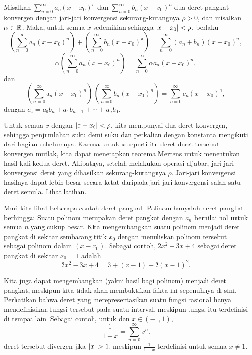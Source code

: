 \begin{prop}
Misalkan $\sum_{n=0}^\infty a_n {(x-x_0)}^n$ dan
$\sum_{n=0}^\infty b_n {(x-x_0)}^n$ dua deret pangkat konvergen
dengan jari-jari konvergensi sekurang-kurangnya $\rho > 0$, dan misalkan $\alpha \in {\mathbb{R}}$.  Maka,
untuk semua $x$ sedemikian sehingga $\lvert {x-x_0} \rvert < \rho$, berlaku
\begin{equation*}
\left(\sum_{n=0}^\infty a_n {(x-x_0)}^n\right)
+
\left(\sum_{n=0}^\infty b_n {(x-x_0)}^n\right)
=
\sum_{n=0}^\infty (a_n+b_n) {(x-x_0)}^n ,
\end{equation*}
\begin{equation*}
\alpha
\left(\sum_{n=0}^\infty a_n {(x-x_0)}^n\right)
=
\sum_{n=0}^\infty \alpha a_n {(x-x_0)}^n ,
\end{equation*}
dan
\begin{equation*}
\left(\sum_{n=0}^\infty a_n {(x-x_0)}^n\right)
\,
\left(\sum_{n=0}^\infty b_n {(x-x_0)}^n\right)
=
\sum_{n=0}^\infty c_n {(x-x_0)}^n ,
\end{equation*}
dengan
$c_n = a_0b_n + a_1 b_{n-1} + \cdots + a_n b_0$.
\end{prop}

Untuk semua $x$ dengan $\lvert {x-x_0} \rvert < \rho$, kita mempunyai dua deret konvergen, sehingga
penjumlahan suku demi suku dan perkalian dengan konstanta
mengikuti dari bagian sebelumnya.
Karena untuk $x$ seperti itu deret-deret tersebut konvergen mutlak,
kita dapat menerapkan teorema Mertens untuk menentukan hasil kali kedua deret.
Akibatnya, setelah melakukan operasi aljabar, jari-jari
konvergensi deret yang dihasilkan sekurang-kurangnya $\rho$.
Jari-jari konvergensi hasilnya dapat lebih besar secara ketat daripada
jari-jari konvergensi salah satu deret semula.
Lihat latihan.

Mari kita lihat beberapa contoh deret pangkat.
Polinom hanyalah deret pangkat berhingga:  Suatu polinom
merupakan deret pangkat dengan
$a_n$ bernilai nol untuk semua $n$ yang cukup besar.  Kita mengembangkan
suatu polinom menjadi deret pangkat di sekitar sembarang titik $x_0$ dengan menuliskan
polinom tersebut sebagai polinom dalam $(x-x_0)$.  Sebagai contoh,
$2x^2-3x+4$ sebagai deret pangkat di sekitar $x_0 = 1$ adalah
\begin{equation*}
2x^2-3x+4 = 3 + (x-1) + 2{(x-1)}^2 .
\end{equation*}

Kita juga dapat mengembangkan
\emph{} (yakni hasil bagi polinom)
menjadi deret pangkat, meskipun kita tidak akan membuktikan fakta ini sepenuhnya di sini.
Perhatikan bahwa deret yang merepresentasikan suatu fungsi rasional hanya mendefinisikan fungsi tersebut
pada suatu interval, meskipun fungsi itu terdefinisi di tempat lain.  Sebagai contoh, untuk
\emph{} dan
$x \in (-1,1)$,
\begin{equation*}
\frac{1}{1-x} =
\sum_{n=0}^\infty x^n .
\end{equation*}
deret tersebut divergen jika $\lvert {x} \rvert > 1$, meskipun $\frac{1}{1-x}$
terdefinisi untuk semua $x \neq 1$.

